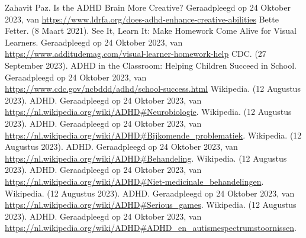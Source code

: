 \documentclass{article}
\begin{document}
\begin{thebibliography}{9}
                Zahavit Paz. Is the ADHD Brain More Creative? Geraadpleegd op 24 Oktober 2023, van \url{https://www.ldrfa.org/does-adhd-enhance-creative-abilities}
                Bette Fetter. (8 Maart 2021). See It, Learn It: Make Homework Come Alive for Visual Learners. Geraadpleegd op 24 Oktober 2023, van \url{https://www.additudemag.com/visual-learner-homework-help}
                CDC. (27 September 2023). ADHD in the Classroom: Helping Children Succeed in School. Geraadpleegd op 24 Oktober 2023, van \url{https://www.cdc.gov/ncbddd/adhd/school-success.html}
                Wikipedia. (12 Augustus 2023). ADHD. Geraadpleegd op 24 Oktober 2023, van \url{https://nl.wikipedia.org/wiki/ADHD#Neurobiologie}.
                Wikipedia. (12 Augustus 2023). ADHD. Geraadpleegd op 24 Oktober 2023, van \url{https://nl.wikipedia.org/wiki/ADHD#Bijkomende_problematiek}.
                Wikipedia. (12 Augustus 2023). ADHD. Geraadpleegd op 24 Oktober 2023, van \url{https://nl.wikipedia.org/wiki/ADHD#Behandeling}.
                Wikipedia. (12 Augustus 2023). ADHD. Geraadpleegd op 24 Oktober 2023, van \url{https://nl.wikipedia.org/wiki/ADHD#Niet-medicinale_behandelingen}.
                Wikipedia. (12 Augustus 2023). ADHD. Geraadpleegd op 24 Oktober 2023, van \url{https://nl.wikipedia.org/wiki/ADHD#Serious_games}.
                Wikipedia. (12 Augustus 2023). ADHD. Geraadpleegd op 24 Oktober 2023, van \url{https://nl.wikipedia.org/wiki/ADHD#ADHD_en_autismespectrumstoornissen}.


\end{thebibliography}
\end{document}
